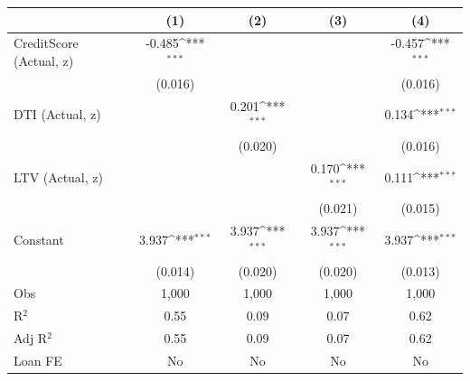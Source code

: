 {
\def\sym#1{\ifmmode^{#1}\else\(^{#1}\)\fi}
\begin{tabular}{l*{4}{c}}
\toprule
                              &\multicolumn{1}{c}{(1)}         &\multicolumn{1}{c}{(2)}         &\multicolumn{1}{c}{(3)}         &\multicolumn{1}{c}{(4)}         \\
\midrule
CreditScore (Actual, z)       &   -0.485\sym{***}&                  &                  &   -0.457\sym{***}\\
                              &  (0.016)         &                  &                  &  (0.016)         \\
DTI (Actual, z)               &                  &    0.201\sym{***}&                  &    0.134\sym{***}\\
                              &                  &  (0.020)         &                  &  (0.016)         \\
LTV (Actual, z)               &                  &                  &    0.170\sym{***}&    0.111\sym{***}\\
                              &                  &                  &  (0.021)         &  (0.015)         \\
Constant                      &    3.937\sym{***}&    3.937\sym{***}&    3.937\sym{***}&    3.937\sym{***}\\
                              &  (0.014)         &  (0.020)         &  (0.020)         &  (0.013)         \\
\midrule
Obs                           &    1,000         &    1,000         &    1,000         &    1,000         \\
R$^2$                         &     0.55         &     0.09         &     0.07         &     0.62         \\
Adj R$^2$                     &     0.55         &     0.09         &     0.07         &     0.62         \\
Loan FE                       &       No         &       No         &       No         &       No         \\
\bottomrule
\end{tabular}
}
